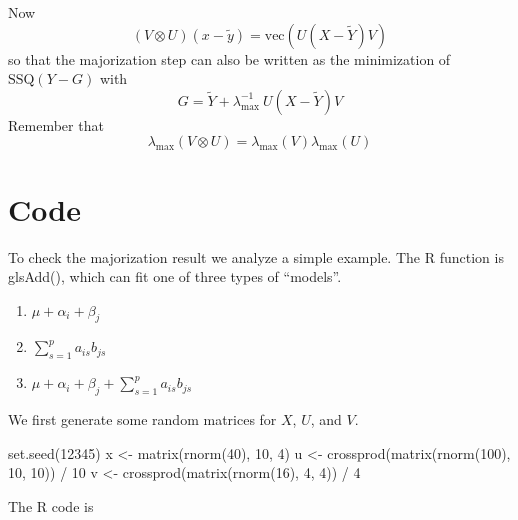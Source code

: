\documentclass[
  12pt,
  letterpaper,
  DIV=11,
  numbers=noendperiod]{scrartcl}
\newenvironment{Shaded}{\begin{snugshade}}{\end{snugshade}}
\newcommand{\DecValTok}[1]{\textcolor[rgb]{0.68,0.00,0.00}{#1}}
\newcommand{\FunctionTok}[1]{\textcolor[rgb]{0.28,0.35,0.67}{#1}}
\newcommand{\NormalTok}[1]{\textcolor[rgb]{0.00,0.23,0.31}{#1}}
\newcommand{\OtherTok}[1]{\textcolor[rgb]{0.00,0.23,0.31}{#1}}
\newcommand{\SpecialCharTok}[1]{\textcolor[rgb]{0.37,0.37,0.37}{#1}}
\providecommand{\tightlist}{%
  \setlength{\itemsep}{0pt}\setlength{\parskip}{0pt}}
\begin{document}
Now \[
(V\otimes U)(x-\tilde y)=\text{vec}(U(X-\tilde Y)V)
\] so that the majorization step can also be written as the minimization
of \(\text{SSQ}(Y-G)\) with \[
G=\tilde Y+\lambda_{\text{max}}^{-1}\ U(X-\tilde Y)V
\] Remember that \[
\lambda_{\text{max}}(V\otimes U)=\lambda_{\text{max}}(V)\lambda_{\text{max}}(U)
\]

\section{Code}\label{code}

To check the majorization result we analyze a simple example. The R
function is glsAdd(), which can fit one of three types of ``models''.

\begin{enumerate}
\def\labelenumi{\arabic{enumi}.}
\tightlist
\item
  \(\mu+\alpha_i+\beta_j\)
\item
  \(\sum_{s=1}^p a_{is}b_{js}\)
\item
  \(\mu+\alpha_i+\beta_j+\sum_{s=1}^p a_{is}b_{js}\)
\end{enumerate}

We first generate some random matrices for \(X\), \(U\), and \(V\).

\begin{Shaded}
\begin{Highlighting}[]
\FunctionTok{set.seed}\NormalTok{(}\DecValTok{12345}\NormalTok{)}
\NormalTok{x }\OtherTok{\textless{}{-}} \FunctionTok{matrix}\NormalTok{(}\FunctionTok{rnorm}\NormalTok{(}\DecValTok{40}\NormalTok{), }\DecValTok{10}\NormalTok{, }\DecValTok{4}\NormalTok{)}
\NormalTok{u }\OtherTok{\textless{}{-}} \FunctionTok{crossprod}\NormalTok{(}\FunctionTok{matrix}\NormalTok{(}\FunctionTok{rnorm}\NormalTok{(}\DecValTok{100}\NormalTok{), }\DecValTok{10}\NormalTok{, }\DecValTok{10}\NormalTok{)) }\SpecialCharTok{/} \DecValTok{10}
\NormalTok{v }\OtherTok{\textless{}{-}} \FunctionTok{crossprod}\NormalTok{(}\FunctionTok{matrix}\NormalTok{(}\FunctionTok{rnorm}\NormalTok{(}\DecValTok{16}\NormalTok{), }\DecValTok{4}\NormalTok{, }\DecValTok{4}\NormalTok{)) }\SpecialCharTok{/} \DecValTok{4}
\end{Highlighting}
\end{Shaded}

The R code is
\end{document}
